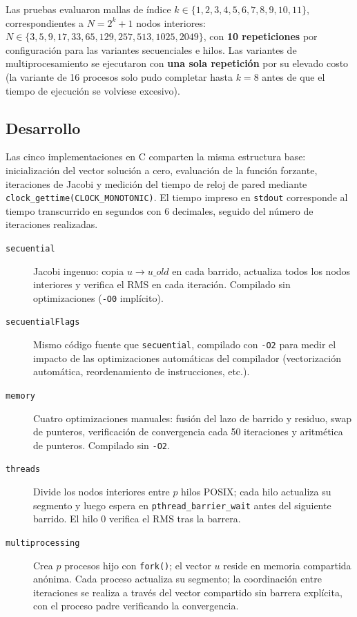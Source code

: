 \documentclass{article}
\begin{document}
Las pruebas evaluaron mallas de índice $k \in \{1, 2, 3, 4, 5, 6, 7, 8, 9, 10, 11\}$, correspondientes a $N = 2^k + 1$ nodos interiores:
$N \in \{3, 5, 9, 17, 33, 65, 129, 257, 513, 1025, 2049\}$,
con \textbf{10 repeticiones} por configuración para las variantes secuenciales e
hilos.  Las variantes de multiprocesamiento se ejecutaron con \textbf{una sola
repetición} por su elevado costo (la variante de 16 procesos solo pudo completar
hasta $k=8$ antes de que el tiempo de ejecución se volviese excesivo).

\subsection{Desarrollo}

Las cinco implementaciones en C comparten la misma estructura base: inicialización del vector solución a cero, evaluación de la función forzante, iteraciones de Jacobi y medición del tiempo de reloj de pared mediante \texttt{clock\_gettime(CLOCK\_MONOTONIC)}.  El tiempo impreso en \texttt{stdout} corresponde al tiempo transcurrido en segundos con 6 decimales, seguido del número de iteraciones realizadas.

\begin{description}
  \item[\texttt{secuential}] Jacobi ingenuo: copia $u \to u\_old$ en cada
    barrido, actualiza todos los nodos interiores y verifica el RMS en cada
    iteración.  Compilado sin optimizaciones (\texttt{-O0} implícito).
  \item[\texttt{secuentialFlags}] Mismo código fuente que \texttt{secuential},
    compilado con \texttt{-O2} para medir el impacto de las optimizaciones
    automáticas del compilador (vectorización automática, reordenamiento de
    instrucciones, etc.).
  \item[\texttt{memory}] Cuatro optimizaciones manuales: fusión del lazo de
    barrido y residuo, swap de punteros, verificación de convergencia cada 50
    iteraciones y aritmética de punteros.  Compilado sin \texttt{-O2}.
  \item[\texttt{threads}] Divide los nodos interiores entre $p$ hilos POSIX;
    cada hilo actualiza su segmento y luego espera en
    \texttt{pthread\_barrier\_wait} antes del siguiente barrido.  El hilo 0
    verifica el RMS tras la barrera.
  \item[\texttt{multiprocessing}] Crea $p$ procesos hijo con \texttt{fork()};
    el vector $u$ reside en memoria compartida anónima.  Cada proceso actualiza
    su segmento; la coordinación entre iteraciones se realiza a través del
    vector compartido sin barrera explícita, con el proceso padre verificando la
    convergencia.
\end{description}
\end{document}
